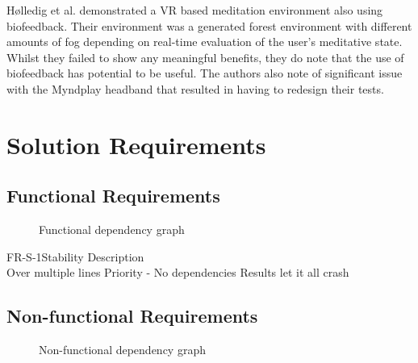 \documentclass[coverpage,lineno]{../custom}
\begin{document}
Hølledig et al. \cite{holledig_zenvr_2018} demonstrated a VR based meditation environment also using biofeedback. Their environment was a generated forest environment with different amounts of fog depending on real-time evaluation of the user's meditative state. Whilst they failed to show any meaningful benefits, they do note that the use of biofeedback has potential to be useful. The authors also note of significant issue with the Myndplay headband that resulted in having to redesign their tests.

\section{Solution Requirements}
\label{sec:req}

\subsection{Functional Requirements}
\label{ssec:f_req}

\begin{figure}[h!]
	\centering
	\caption{Functional dependency graph}
\end{figure}

\FunctionalReq
{FR-S-1}{Stability}
{Description\\Over multiple lines}
{Priority - \musthave \shouldhave \couldhave}
{No dependencies}
{Results}
{let it all crash}

\subsection{Non-functional Requirements}
\label{ssec:nf_req}

\begin{figure}[h!]
	\centering
	\caption{Non-functional dependency graph}
\end{figure}
\end{document}
